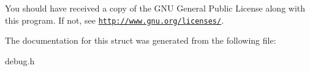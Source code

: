 You should have received a copy of the G\-N\-U General Public License along with this program. If not, see \href{http://www.gnu.org/licenses/}{\tt http\-://www.\-gnu.\-org/licenses/}. 

The documentation for this struct was generated from the following file\-:\begin{DoxyCompactItemize}
\item 
debug.\-h\end{DoxyCompactItemize}
